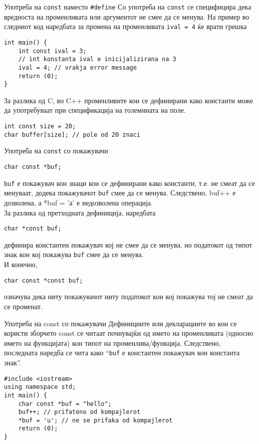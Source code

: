 \begin{frame}[fragile]{Употреба на \texttt{const} наместо \texttt{\#define}}
Со употреба на \texttt{const} се специфицира дека вредноста на променливата или
аргументот не смее да се менува. На пример во следниот код наредбата за промена
на променливата \texttt{ival = 4} ќе врати грешка
\begin{lstlisting}
int main() {
    int const ival = 3;
    // int konstanta ival e inicijalizirana na 3
    ival = 4; // vrakja error message
    return (0);
}
\end{lstlisting}
За разлика од C, во C++ променливите кои се дефинирани како константи може да
употребуваат при спецификација на големината на поле.
\begin{lstlisting}
int const size = 20;
char buffer[size]; // pole od 20 znaci
\end{lstlisting}
\end{frame}

\begin{frame}[fragile]{Употреба на \texttt{const} со покажувачи}
\begin{lstlisting}
char const *buf;
\end{lstlisting}
\texttt{buf} е покажувач кон знаци кои се дефинирани како константи, т.е. не смеат да се
менуваат, додека покажувачот \texttt{buf} смее да се менува. Следствено, buf++ е
дозволена, а *buf = 'а' е недозволена операција.\\
За разлика од претходната дефиниција, наредбата
\begin{lstlisting}
char *const buf;
\end{lstlisting}
дефинира константен покажувач кој не смее да се менува, но податокот од типот
знак кон кој покажува \texttt{buf} смее да се менува.\\ 
И конечно,
\begin{lstlisting}
char const *const buf;
\end{lstlisting}
означува дека ниту покажувачот ниту податокот кон кој покажува тој не смеат да
се променат.
\end{frame}

\begin{frame}[fragile]{Употреба на const со покажувачи}
Дефинициите или декларациите во кои се користи зборчето const се читаат
почнувајќи од името на променливата (односно името на функцијата) кон типот на
променлива/функција. Следствено, последната наредба се чита како ``\texttt{buf} е
константен покажувач кон константа знак''.
\begin{lstlisting}
#include <iostream>
using namespace std;
int main() {
    char const *buf = "hello";
    buf++; // prifateno od kompajlerot
    *buf = 'u'; // ne se prifaka od kompajlerot
    return (0);
}
\end{lstlisting}
\end{frame}

